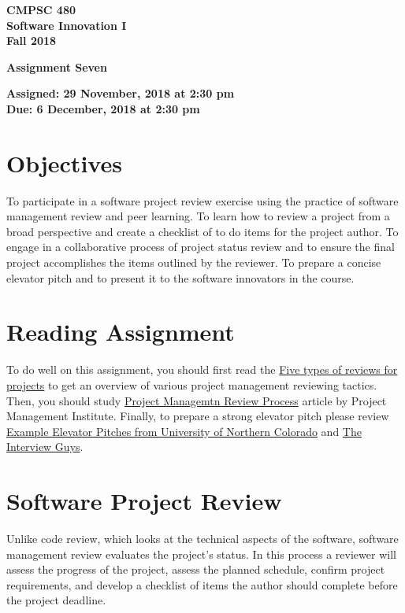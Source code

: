 \documentclass[11pt]{article}
\newcommand{\assignmentduedate}{6 December}
\newcommand{\assignmentassignedate}{ 29 November}
\newcommand{\assignmentnumber}{Seven}
\newcommand{\labyear}{2018}
\newcommand{\labtime}{2:30 pm}
\newcommand{\assigneddate}{Assigned:  \assignmentassignedate, \labyear{} at \labtime{}}
\newcommand{\duedate}{Due:  \assignmentduedate, \labyear{} at \labtime{}}
\newcommand{\labtitle}[1]
{
  \begin{center}
    \begin{center}
      \bf
      CMPSC 480 \\ Software Innovation I\\
      Fall 2018\\
      \medskip
    \end{center}
    \bf
    #1
  \end{center}
}
\begin{document}
\thispagestyle{empty}

\labtitle{Assignment \assignmentnumber{} }
\begin{center} \textbf{ \assigneddate{} \\ \duedate{} } \end{center} 
\noindent \textbf{ }

\section*{Objectives}


To participate in a software project review exercise using the practice of software management review and peer learning. To learn how to review a project from a broad perspective and create a checklist of to do items for the project author. To engage in a collaborative process of project status review and to ensure the final project accomplishes the items outlined by the reviewer. To prepare a concise elevator pitch and to present it to the software innovators in the course.


\section*{Reading Assignment}

To do well on this assignment, you
should first read the \href{https://www.data-solutions.ch/2018/03/five-types-of-reviews-for-projects.html}{Five types of reviews for projects} to get an overview of various project management reviewing tactics. Then, you should study \href{https://www.pmi.org/learning/library/tool-project-management-review-process-7881}{Project Managemtn Review Process} article by Project Management Institute.
Finally, to prepare a strong elevator pitch please review \href{
https://mcb.unco.edu/students/networking-night/examples-MCB-Pitch-Contest.aspx}{Example Elevator Pitches from University of Northern Colorado} and \href{https://theinterviewguys.com/write-elevator-pitch/}{The Interview Guys}.

\section*{Software Project Review}
Unlike code review, which looks at the technical aspects of the software, software management review evaluates the project's status. In this process a reviewer will assess the progress of the project, assess the planned schedule, confirm project requirements, and develop a checklist of items the author should complete before the project deadline.
\end{document}
